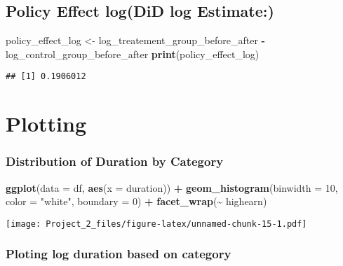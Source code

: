 \documentclass[
]{article}
\newenvironment{Shaded}{\begin{snugshade}}{\end{snugshade}}
\newcommand{\AttributeTok}[1]{\textcolor[rgb]{0.13,0.29,0.53}{#1}}
\newcommand{\DecValTok}[1]{\textcolor[rgb]{0.00,0.00,0.81}{#1}}
\newcommand{\FunctionTok}[1]{\textcolor[rgb]{0.13,0.29,0.53}{\textbf{#1}}}
\newcommand{\NormalTok}[1]{#1}
\newcommand{\OtherTok}[1]{\textcolor[rgb]{0.56,0.35,0.01}{#1}}
\newcommand{\SpecialCharTok}[1]{\textcolor[rgb]{0.81,0.36,0.00}{\textbf{#1}}}
\newcommand{\StringTok}[1]{\textcolor[rgb]{0.31,0.60,0.02}{#1}}
\begin{document}
\subsection{Policy Effect log(DiD log
Estimate:)}\label{policy-effect-logdid-log-estimate}

\begin{Shaded}
\begin{Highlighting}[]
\NormalTok{policy\_effect\_log }\OtherTok{\textless{}{-}}\NormalTok{ log\_treatement\_group\_before\_after }\SpecialCharTok{{-}}\NormalTok{ log\_control\_group\_before\_after}
\FunctionTok{print}\NormalTok{(policy\_effect\_log)}
\end{Highlighting}
\end{Shaded}

\begin{verbatim}
## [1] 0.1906012
\end{verbatim}

\section{Plotting}\label{plotting}

\subsubsection{Distribution of Duration by
Category}\label{distribution-of-duration-by-category}

\begin{Shaded}
\begin{Highlighting}[]
\FunctionTok{ggplot}\NormalTok{(}\AttributeTok{data =}\NormalTok{ df, }\FunctionTok{aes}\NormalTok{(}\AttributeTok{x =}\NormalTok{ duration)) }\SpecialCharTok{+}
  \FunctionTok{geom\_histogram}\NormalTok{(}\AttributeTok{binwidth =} \DecValTok{10}\NormalTok{, }\AttributeTok{color =} \StringTok{"white"}\NormalTok{, }\AttributeTok{boundary =} \DecValTok{0}\NormalTok{) }\SpecialCharTok{+}
  \FunctionTok{facet\_wrap}\NormalTok{(}\SpecialCharTok{\textasciitilde{}}\NormalTok{ highearn)}
\end{Highlighting}
\end{Shaded}

\texttt{[image: Project\_2\_files/figure-latex/unnamed-chunk-15-1.pdf]}

\subsubsection{Ploting log duration based on
category}\label{ploting-log-duration-based-on-category}
\end{document}

